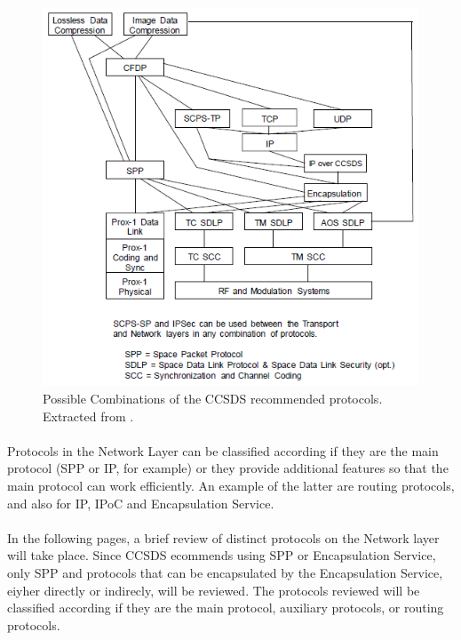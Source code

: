 \begin{figure}[H]
\begin{center}
\includegraphics[scale=1]{CCSDScombinations.PNG}
\caption[Combination of CCSDS Recommended Protocols]{Possible Combinations of the CCSDS recommended protocols. Extracted from \cite{CCSDSOverview}.}
\label{fig:CCSDScombinations}
\end{center}
\end{figure}
\paragraph{}Protocols in the Network Layer can be classified according if they are the main protocol (SPP or IP, for example) or they provide additional features so that the main protocol can work efficiently. An example of the latter are routing protocols, and also for IP, IPoC and Encapsulation Service.
\paragraph{}In the following pages, a brief review of distinct protocols on the Network layer will take place. Since CCSDS ecommends using SPP or Encapsulation Service, only SPP and protocols that can be encapsulated by the Encapsulation Service, eiyher directly or indirecly, will be reviewed. The protocols reviewed will be classified according if they are the main protocol, auxiliary protocols, or routing protocols.

